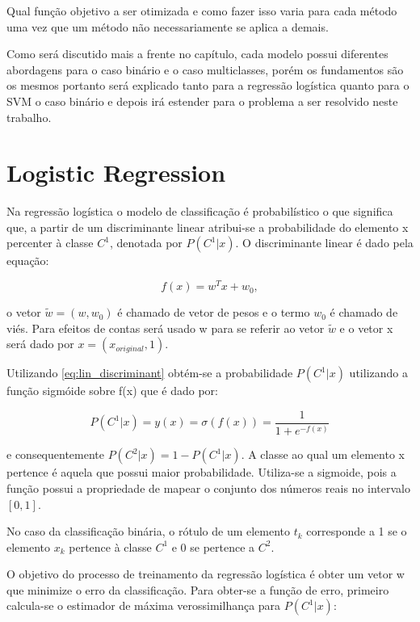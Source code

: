 Qual função objetivo a ser otimizada e como fazer isso varia para cada método uma vez que
um método não necessariamente se aplica a demais.

Como será discutido mais a frente no capítulo, cada modelo possui diferentes abordagens para o
caso binário e o caso multiclasses, porém os fundamentos são os mesmos portanto será explicado
tanto para a regressão logística quanto para o SVM o caso binário e depois irá estender para
o problema a ser resolvido neste trabalho.


\section{Logistic Regression}
\label{sec:logreg} 

Na regressão logística o modelo de classificação é probabilístico o que significa
que, a partir de um discriminante linear atribui-se a probabilidade do
elemento x percenter à classe $C^1$, denotada por $P(C^1 | x)$. O discriminante
linear é dado pela equação: 
\begin{center}
	\begin{equation}
		\label{eq:lin_discriminant}
		f(x) = w^Tx + w_0,
	\end{equation}
\end{center}

o vetor $\tilde{w} = (w, w_0)$
é chamado de vetor de pesos e o termo $w_0$ é chamado de viés.
Para efeitos de contas
será usado w para se referir ao vetor $\tilde{w}$ e o vetor x será dado por $x = (x_{original}, 1)$.

Utilizando \ref{eq:lin_discriminant} obtém-se a probabilidade $P(C^1 | x)$ utilizando a função sigmóide
sobre f(x) que é dado por:

\begin{center}
	\begin{equation}
		\label{eq:sigmoid_y}
		P(C^1 | x) = y(x) = \sigma(f(x)) = \frac{1}{1 + e^{-f(x)}}
	\end{equation}
\end{center}
e consequentemente $P(C^2 | x) = 1 - P(C^1 | x)$.
A classe ao qual um elemento x pertence é aquela que possui maior probabilidade. Utiliza-se
a sigmoide, pois a função possui a propriedade de mapear o conjunto dos números reais no intervalo
$[0, 1]$.

No caso da classificação binária, o rótulo de um elemento $t_k$ corresponde a 1 se o elemento $x_k$
pertence à classe $C^1$ e 0 se pertence a $C^2$.

O objetivo do processo de treinamento da regressão logística é obter um vetor w que minimize
o erro da classificação. Para obter-se a função de erro, primeiro calcula-se o estimador
de máxima verossimilhança para $P(C^1 | x)$:

